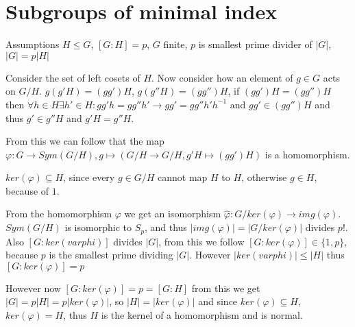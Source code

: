 \section{Subgroups of minimal index}
Assumptions $H \leq G$, $[G:H]=p$, $G$ finite, $p$ is smallest prime divider of $|G|$, $|G|=p|H|$

Consider the set of left cosets of $H$. Now consider how an element of $g\in G$ acts on $G/H$. $g(g'H)=(gg')H$, $g(g''H)=(gg'')H$, if $(gg')H=(gg'')H$ then $\forall h \in H \exists h' \in H : gg'h=gg''h' \rightarrow gg'=gg''h'h^{-1}$ and $gg' \in (gg'')H$ and thus $g' \in g''H$ and $g'H=g''H$. 

From this we can follow that the map $\varphi : G \rightarrow Sym(G/H), g \mapsto (G/H \rightarrow G/H, g'H \mapsto (gg')H)$ is a homomorphism.

$ker(\varphi) \subseteq H$, since every $g \in G/H$ cannot map $H$ to $H$, otherwise $g \in H$, because of $1$. 

From the homomorphism $\varphi$ we get an isomorphism $\hat{\varphi}: G/ker(\varphi) \rightarrow img(\varphi)$. $Sym(G/H)$ is isomorphic to $S_p$, and thus $|img(\varphi)|=|G/ker(\varphi)|$ divides $p!$. Also $[G:ker(varphi)]$ divides $|G|$, from this we follow $[G:ker(\varphi)]\in \{1,p\}$, because $p$ is the smallest prime dividing $|G|$. However $|ker(varphi)| \leq |H|$ thus $[G:ker(\varphi)]=p$

However now $[G:ker(\varphi)]=p=[G:H]$ from this we get $|G|=p|H|=p|ker(\varphi)|$, so $|H|=|ker(\varphi)|$ and since $ker(\varphi) \subseteq H$, $ker(\varphi)=H$, thus $H$ is the kernel of a homomorphism and is normal. 